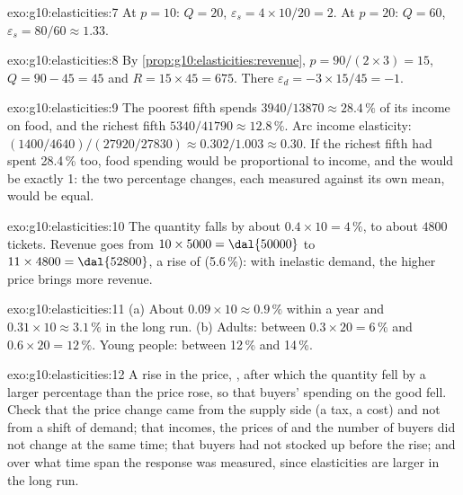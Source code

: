 \begin{solution}{exo:g10:elasticities:7}
At $p = 10$: $Q = 20$, $\varepsilon_s = 4 \times 10/20 = 2$. At $p = 20$: $Q = 60$, $\varepsilon_s = 80/60 \approx 1.33$.
\end{solution}

\begin{solution}{exo:g10:elasticities:8}
By \cref{prop:g10:elasticities:revenue}, $p = 90/(2 \times 3) = 15$, $Q = 90 - 45 = 45$ and $R = 15 \times 45 = 675$. There $\varepsilon_d = -3 \times 15/45 =
-1$.
\end{solution}

\begin{solution}{exo:g10:elasticities:9}
The poorest fifth spends $3940/13870 \approx 28.4\,\%$ of its income on food, and the richest fifth $5340/41790 \approx
12.8\,\%$. Arc income elasticity: $(1400/4640)/(27920/27830) \approx 0.302/1.003 \approx 0.30$. If
the richest fifth had spent 28.4\,\% too, food spending would be proportional to income, and the  would be exactly 1: the two percentage
changes, each measured against its own mean, would be equal.
\end{solution}

\begin{solution}{exo:g10:elasticities:10}
The quantity falls by about $0.4 \times 10 = 4\,\%$, to about $4800$ tickets. Revenue goes from $10 \times 5000 = \text{\dal{50000}}$ to $11 \times 4800 = \text{\dal{52800}}$,
a rise of  (5.6\,\%): with inelastic demand, the higher price brings more revenue.
\end{solution}

\begin{solution}{exo:g10:elasticities:11}
(a) About $0.09 \times 10 \approx 0.9\,\%$ within a year and $0.31 \times 10 \approx 3.1\,\%$ in the long run. (b) Adults: between $0.3 \times 20 = 6\,\%$ and $0.6
\times 20 = 12\,\%$. Young people: between 12\,\% and 14\,\%.
\end{solution}

\begin{solution}{exo:g10:elasticities:12}
A rise in the price, , after which the quantity fell by a larger percentage than the price rose, so that buyers' spending on the good fell.
Check that the price change came from the supply side (a tax, a cost) and not from a shift of demand; that incomes, the prices of  and the number
of buyers did not change at the same time; that buyers had not stocked up before the rise; and over what time span the response was measured, since
elasticities are larger in the long run.
\end{solution}

